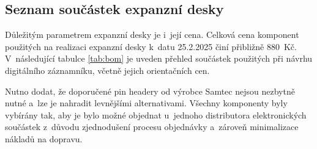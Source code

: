 \newpage


\subsection{Seznam součástek expanzní desky}
\label{bom_list}

Důležitým parametrem expanzní desky je i~její cena. Celková cena komponent použitých na realizaci expanzní desky k~datu 25.2.2025 činí přibližně 880~Kč. V~následující tabulce \ref{tab:bom} je uveden přehled součástek použitých při návrhu digitálního záznamníku, včetně jejich orientačních cen. 

Nutno dodat, že doporučené pin headery od výrobce Samtec nejsou nezbytně nutné a~lze je nahradit levnějšími alternativami. Všechny komponenty byly vybírány tak, aby je bylo možné objednat u~jednoho distributora elektronických součástek z~důvodu zjednodušení procesu objednávky a~zároveň minimalizace nákladů na dopravu.

